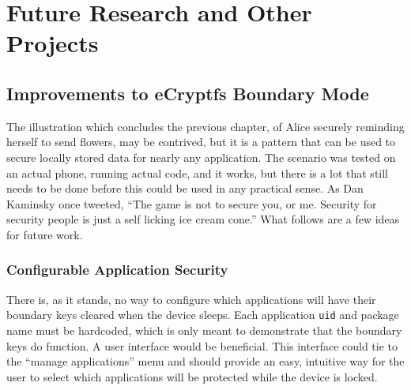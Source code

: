\chapter{Future Research and Other Projects}
\label{ch:future}

\section{Improvements to eCryptfs Boundary Mode}
\label{sec:future}

The illustration which concludes the previous chapter, of Alice securely reminding herself to send flowers, may be contrived, but it
is a pattern that can be used to secure locally stored data for nearly any application. The scenario was tested on an actual phone,
running actual code, and it works, but there is a lot that still needs to be done before this could be used in any practical sense.
As Dan Kaminsky once tweeted, ``The game is not to secure you, or me. Security for security people is just a self licking ice cream
cone.'' What follows are a few ideas for future work.

\subsection{Configurable Application Security}
There is, as it stands, no way to configure which applications will have their boundary keys cleared when the device sleeps. 
Each application \texttt{uid} and package name must be hardcoded, which is only meant to demonstrate that the 
boundary keys do function. A user interface would be beneficial. This interface could tie to the ``manage applications'' menu and
should provide an easy, intuitive way for the user to select which applications will be protected while the device is locked.

